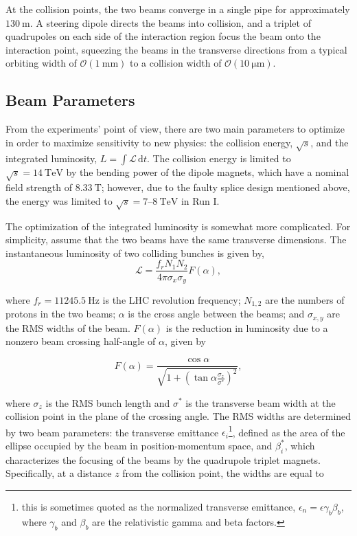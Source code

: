 At the collision points, the two beams converge in a single pipe for approximately $\SI{130}{\meter}$. A steering dipole directs the beams into collision, and a triplet of quadrupoles on each side of the interaction region focus the beam onto the interaction point, squeezing the beams in the transverse directions from a typical orbiting width of $\mathcal{O}(\SI{1}{\milli\meter})$ to a collision width of $\mathcal{O}(\SI{10}{\micro\meter})$. 


\subsection{Beam Parameters}
From the experiments' point of view, there are two main parameters to optimize in order to maximize sensitivity to new physics: the collision energy, $\sqrt{s}$, and the integrated luminosity, $L=\int \mathcal{L}\, \mathrm{d}t$. The collision energy is limited to $\sqrt{s}=\SI{14}{\tera\electronvolt}$ by the bending power of the dipole magnets, which have a nominal field strength of $\SI{8.33}{\tesla}$; however, due to the faulty splice design mentioned above, the energy was limited to $\sqrt{s}=7$--$\SI{8}{\tera\electronvolt}$ in Run I. 

The optimization of the integrated luminosity is somewhat more complicated. For simplicity, assume that the two beams have the same transverse dimensions. The instantaneous luminosity of two colliding bunches is given by,
\begin{equation}\label{eqn:lumi}
	\mathcal{L} = \frac{f_r N_1 N_2}{4\pi \sigma_x\sigma_y} F(\alpha),
\end{equation}

where $f_r=\SI{11245.5}{\hertz}$ is the LHC revolution frequency; $N_{1,2}$ are the numbers of protons in the two beams; $\alpha$ is the cross angle between the beams; and $\sigma_{x,y}$ are the RMS widths of the beam. $F(\alpha)$ is the reduction in luminosity due to a nonzero beam crossing half-angle of $\alpha$, given by

\begin{equation}\label{eqn:crossing-angle-lumi-reduction}
	F(\alpha)=\frac{\cos\alpha}{\sqrt{1+\left(\tan\alpha \frac{\sigma_z}{\sigma^*}\right)^2}},
\end{equation}

where $\sigma_z$ is the RMS bunch length and $\sigma^{*}$ is the transverse beam width at the collision point in the plane of the crossing angle. The RMS widths are determined by two beam parameters: the transverse emittance $\epsilon_i$\footnote{this is sometimes quoted as the normalized transverse emittance, $\epsilon_n =\epsilon \gamma_b \beta_b$, where $\gamma_b$ and $\beta_b$ are the relativistic gamma and beta factors.}, defined as the area of the ellipse occupied by the beam in position-momentum space, and $\beta^*_i$, which characterizes the focusing of the beams by the quadrupole triplet magnets. Specifically, at a distance $z$ from the collision point, the widths are equal to

